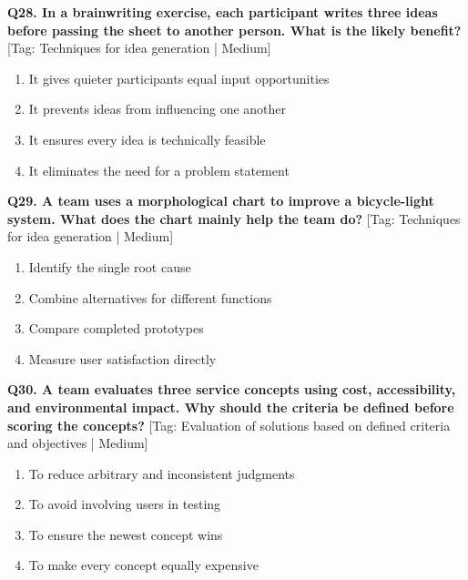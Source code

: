 \noindent\textbf{Q28. In a brainwriting exercise, each participant writes three ideas before passing the sheet to another person. What is the likely benefit?} \hfill [Tag: Techniques for idea generation | Medium]
\begin{enumerate}[label=(\alph*),topsep=2pt,itemsep=1pt,partopsep=0pt,parsep=0pt]
    \item {It gives quieter participants equal input opportunities}
    \item {It prevents ideas from influencing one another}
    \item {It ensures every idea is technically feasible}
    \item {It eliminates the need for a problem statement}
\end{enumerate}
\vspace{2mm}

\noindent\textbf{Q29. A team uses a morphological chart to improve a bicycle-light system. What does the chart mainly help the team do?} \hfill [Tag: Techniques for idea generation | Medium]
\begin{enumerate}[label=(\alph*),topsep=2pt,itemsep=1pt,partopsep=0pt,parsep=0pt]
    \item {Identify the single root cause}
    \item {Combine alternatives for different functions}
    \item {Compare completed prototypes}
    \item {Measure user satisfaction directly}
\end{enumerate}
\vspace{2mm}

\noindent\textbf{Q30. A team evaluates three service concepts using cost, accessibility, and environmental impact. Why should the criteria be defined before scoring the concepts?} \hfill [Tag: Evaluation of solutions based on defined criteria and objectives | Medium]
\begin{enumerate}[label=(\alph*),topsep=2pt,itemsep=1pt,partopsep=0pt,parsep=0pt]
    \item {To reduce arbitrary and inconsistent judgments}
    \item {To avoid involving users in testing}
    \item {To ensure the newest concept wins}
    \item {To make every concept equally expensive}
\end{enumerate}
\vspace{2mm}

